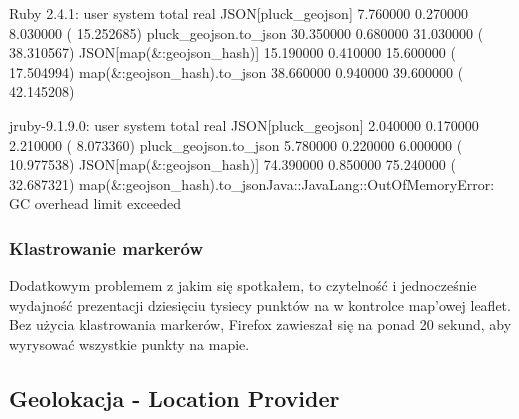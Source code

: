 Ruby 2.4.1:
       user     system      total        real
JSON[pluck_geojson]  7.760000   0.270000   8.030000 ( 15.252685)
pluck_geojson.to_json 30.350000   0.680000  31.030000 ( 38.310567)
JSON[map(&:geojson_hash)] 15.190000   0.410000  15.600000 ( 17.504994)
map(&:geojson_hash).to_json 38.660000   0.940000  39.600000 ( 42.145208)

jruby-9.1.9.0:
       user     system      total        real
JSON[pluck_geojson]  2.040000   0.170000   2.210000 (  8.073360)
pluck_geojson.to_json  5.780000   0.220000   6.000000 ( 10.977538)
JSON[map(&:geojson_hash)] 74.390000   0.850000  75.240000 ( 32.687321)
map(&:geojson_hash).to_jsonJava::JavaLang::OutOfMemoryError: GC overhead limit exceeded


\subsubsection{Klastrowanie markerów}

Dodatkowym problemem z jakim się spotkałem, to czytelność i jednocześnie wydajność prezentacji dziesięciu tysiecy punktów na w kontrolce map'owej leaflet. Bez użycia klastrowania markerów, Firefox zawieszał się na ponad 20 sekund, aby wyrysować wszystkie punkty na mapie.










\subsection{Geolokacja - Location Provider}
